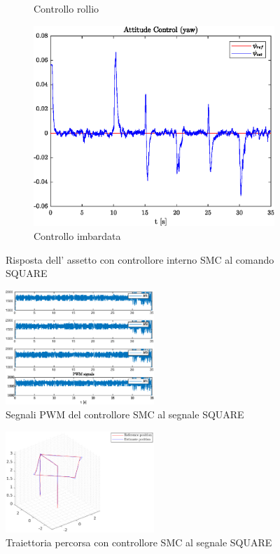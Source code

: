 \begin{figure}
\begin{subfigure}{0.45\textwidth}
		\caption{Controllo rollio}
	\end{subfigure}
	\hfill
	\begin{subfigure}{0.45\textwidth}
		\centering
		\includegraphics[width=1\textwidth]{Simulazioni/Figure/SMC/SQUARE/AttitudeControlYaw}
		\caption{Controllo imbardata}
	\end{subfigure}
	\caption{Risposta dell' assetto con controllore interno SMC al comando SQUARE}
\end{figure}


\begin{figure}
	\centering
	\includegraphics[width=0.5\textwidth]{Simulazioni/Figure/SMC/SQUARE/PWM}
	\caption{Segnali PWM del controllore SMC al segnale SQUARE}
\end{figure}
\begin{figure}
	\centering
	\includegraphics[width=0.5\textwidth]{Simulazioni/Figure/SMC/SQUARE/Trajectory}
	\caption{Traiettoria percorsa con controllore SMC al segnale SQUARE}
\end{figure}

